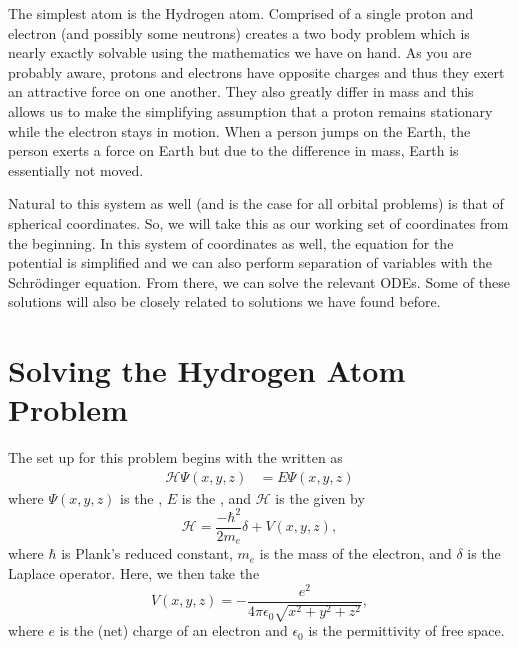 \documentclass{article}
\newcommand{\hamiltonian}{\mathcal{H}}
\begin{document}
The simplest atom is the Hydrogen atom.  Comprised of a single proton and electron (and possibly some neutrons) creates a two body problem which is nearly exactly solvable using the mathematics we have on hand.  As you are probably aware, protons and electrons have opposite charges and thus they exert an attractive force on one another.  They also greatly differ in mass and this allows us to make the simplifying assumption that a proton remains stationary while the electron stays in motion.  When a person jumps on the Earth, the person exerts a force on Earth but due to the difference in mass, Earth is essentially not moved.

Natural to this system as well (and is the case for all orbital problems) is that of spherical coordinates.  So, we will take this as our working set of coordinates from the beginning.  In this system of coordinates as well, the equation for the potential is simplified and we can also perform separation of variables with the Schr\"odinger equation.  From there, we can solve the relevant ODEs.  Some of these solutions will also be closely related to solutions we have found before. 

\section{Solving the Hydrogen Atom Problem}
The set up for this problem begins with the  written as
\begin{align*}
    \hamiltonian\Psi(x,y,z) &= E \Psi(x,y,z)
\end{align*}
where $\Psi(x,y,z)$ is the , $E$ is the , and $\hamiltonian$ is the  given by
\[
\hamiltonian= \frac{-\hbar^2}{2m_e}\delta + V(x,y,z),
\]
where $\hbar$ is Plank's reduced constant, $m_e$ is the mass of the electron, and $\delta$ is the Laplace operator. Here, we then take the  
\[
V(x,y,z) = -\frac{e^2}{4\pi \epsilon_0 \sqrt{x^2+y^2 + z^2} },
\]
where $e$ is the (net) charge of an electron and $\epsilon_0$ is the permittivity of free space. 
\end{document}
